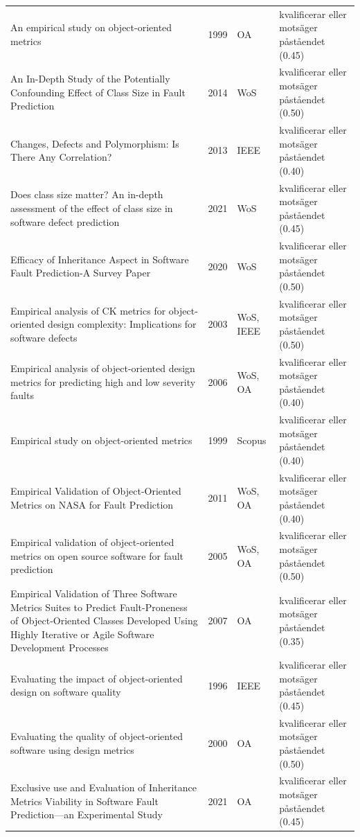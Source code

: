 \begin{longtable}{@{}%
  >{\raggedright\arraybackslash}p{}c%
  >{\raggedright\arraybackslash}p{}%
  >{\raggedright\arraybackslash}p{}@{}}
An empirical study on object-oriented metrics & 1999 & OA & kvalificerar eller motsäger påståendet (0.45) \\
An In-Depth Study of the Potentially Confounding Effect of Class Size in Fault Prediction & 2014 & WoS & kvalificerar eller motsäger påståendet (0.50) \\
Changes, Defects and Polymorphism: Is There Any Correlation? & 2013 & IEEE & kvalificerar eller motsäger påståendet (0.40) \\
Does class size matter? An in-depth assessment of the effect of class size in software defect prediction & 2021 & WoS & kvalificerar eller motsäger påståendet (0.45) \\
Efficacy of Inheritance Aspect in Software Fault Prediction-A Survey Paper & 2020 & WoS & kvalificerar eller motsäger påståendet (0.50) \\
Empirical analysis of CK metrics for object-oriented design complexity: Implications for software defects & 2003 & WoS, IEEE & kvalificerar eller motsäger påståendet (0.50) \\
Empirical analysis of object-oriented design metrics for predicting high and low severity faults & 2006 & WoS, OA & kvalificerar eller motsäger påståendet (0.40) \\
Empirical study on object-oriented metrics & 1999 & Scopus & kvalificerar eller motsäger påståendet (0.40) \\
Empirical Validation of Object-Oriented Metrics on NASA for Fault Prediction & 2011 & WoS, OA & kvalificerar eller motsäger påståendet (0.40) \\
Empirical validation of object-oriented metrics on open source software for fault prediction & 2005 & WoS, OA & kvalificerar eller motsäger påståendet (0.50) \\
Empirical Validation of Three Software Metrics Suites to Predict Fault-Proneness of Object-Oriented Classes Developed Using Highly Iterative or Agile Software Development Processes & 2007 & OA & kvalificerar eller motsäger påståendet (0.35) \\
Evaluating the impact of object-oriented design on software quality & 1996 & IEEE & kvalificerar eller motsäger påståendet (0.45) \\
Evaluating the quality of object-oriented software using design metrics & 2000 & OA & kvalificerar eller motsäger påståendet (0.50) \\
Exclusive use and Evaluation of Inheritance Metrics Viability in Software Fault Prediction---an Experimental Study & 2021 & OA & kvalificerar eller motsäger påståendet (0.45) \\

\end{longtable}
